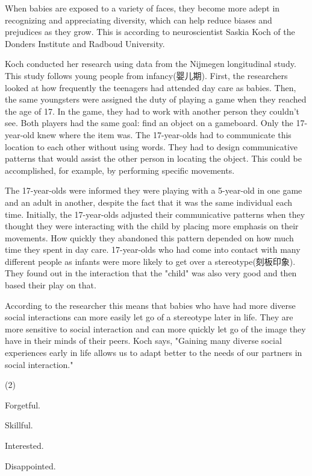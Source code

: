 \documentclass{英语试卷}
\begin{document}
\par When babies are exposed to a variety of faces, they become more adept in recognizing and appreciating diversity, which can help reduce biases and prejudices as they grow. This is according to neuroscientist Saskia Koch of the Donders Institute and Radboud University.\par
\par Koch conducted her research using data from the Nijmegen longitudinal study. This study follows young people from infancy(婴儿期). First, the researchers looked at how frequently the teenagers had attended day care as babies. Then, the same youngsters were assigned the duty of playing a game when they reached the age of 17. In the game, they had to work with another person they couldn't see. Both players had the same goal: find an object on a gameboard. Only the 17-year-old knew where the item was. The 17-year-olds had to communicate this location to each other without using words. They had to design communicative patterns that would assist the other person in locating the object. This could be accomplished, for example, by performing specific movements.\par
\par The 17-year-olds were informed they were playing with a 5-year-old in one game and an adult in another, despite the fact that it was the same individual each time. Initially, the 17-year-olds adjusted their communicative patterns when they thought they were interacting with the child by placing more emphasis on their movements. How quickly they abandoned this pattern depended on how much time they spent in day care. 17-year-olds who had come into contact with many different people as infants were more likely to get over a stereotype(刻板印象). They found out in the interaction that the "child" was also very good and then based their play on that.\par
\par According to the researcher this means that babies who have had more diverse social interactions can more easily let go of a stereotype later in life. They are more sensitive to social interaction and can more quickly let go of the image they have in their minds of their peers. Koch says, "Gaining many diverse social experiences early in life allows us to adapt better to the needs of our partners in social interaction."\par
{}
\begin{choices}(2)
  \item Forgetful.
  \item Skillful.
  \item Interested.
  \item Disappointed.
\end{choices}
\end{document}
